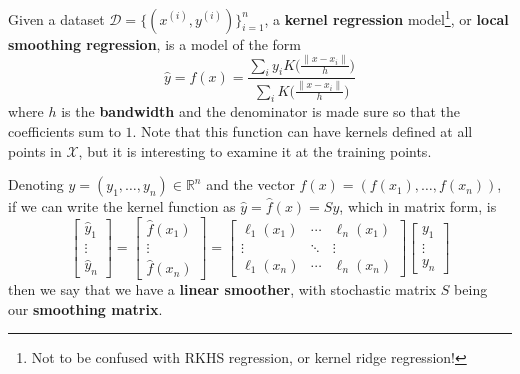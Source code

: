   \begin{definition}
    \label{def:kernel-regression}
    Given a dataset $\mathcal{D} = \{(x^{(i)}, y^{(i)})\}_{i=1}^n$, a \textbf{kernel regression} model\footnote{Not to be confused with RKHS regression, or kernel ridge regression!}, or \textbf{local smoothing regression}, is a model of the form 
    \begin{equation}
      \hat{y} = f(x) = \frac{\sum_{i} y_i K \bigg( \frac{\|x - x_i\|}{h} \bigg)}{\sum_{i} K \bigg( \frac{\|x - x_i\|}{h} \bigg)}
    \end{equation}
    where $h$ is the \textbf{bandwidth} and the denominator is made sure so that the coefficients sum to $1$. Note that this function can have kernels defined at all points in $\mathcal{X}$, but it is interesting to examine it at the training points. 
  \end{definition}

  Denoting $y = (y_1, \ldots, y_n) \in \mathbb{R}^n$ and the vector $f(x) = (f(x_1), \ldots, f(x_n))$, if we can write the kernel function as $\hat{y} = \hat{f}(x) = S y$, which in matrix form, is 
  \begin{equation}
    \begin{bmatrix} \hat{y}_1 \\ \vdots \\ \hat{y}_n \end{bmatrix} = \begin{bmatrix} \hat{f}(x_1) \\ \vdots \\ \hat{f} (x_n) \end{bmatrix} = \begin{bmatrix} \ell_1 (x_1) & \cdots & \ell_n (x_1) \\ \vdots & \ddots & \vdots \\ \ell_1 (x_n) & \cdots & \ell_n (x_n) \end{bmatrix} \begin{bmatrix} y_1 \\ \vdots \\ y_n \end{bmatrix} 
  \end{equation}
  then we say that we have a \textbf{linear smoother}, with stochastic matrix $S$ being our \textbf{smoothing matrix}. 


